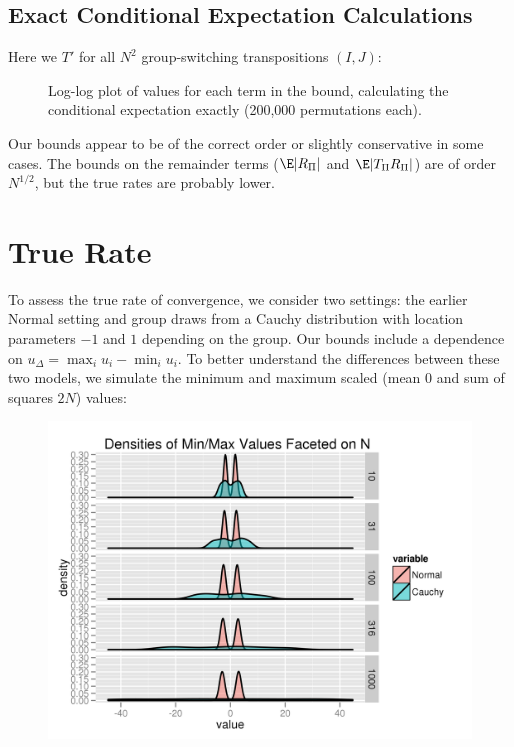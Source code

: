 \subsection{Exact Conditional Expectation Calculations}
Here we $T'$ for all $N^2$ group-switching transpositions $(I, J)$:
\begin{figure}[!ht]
  \centering
  
  \caption{Log-log plot of values for each term in the bound, calculating the conditional
    expectation exactly (200,000 permutations each).}
\end{figure}

Our bounds appear to be of the correct order or slightly conservative in some cases.  The bounds on
the remainder terms ($\E |R_{\Pi}|$ and $\E |T_{\Pi}R_{\Pi}|$) are of order $N^{1/2}$, but the true
rates are probably lower.
\clearpage

\section{True Rate}
To assess the true rate of convergence, we consider two settings: the earlier Normal setting and
group draws from a Cauchy distribution with location parameters $-1$ and $1$ depending on the
group.  Our bounds include a dependence on $u_{\Delta} = \max_i u_{i} - \min_i u_{i}$.  To better
understand the differences between these two models, we simulate the minimum and maximum scaled
(mean $0$ and sum of squares $2N$) values:
\begin{figure}[!ht]
  \centering
  \includegraphics{./simulations/sim5.png}
\end{figure}

